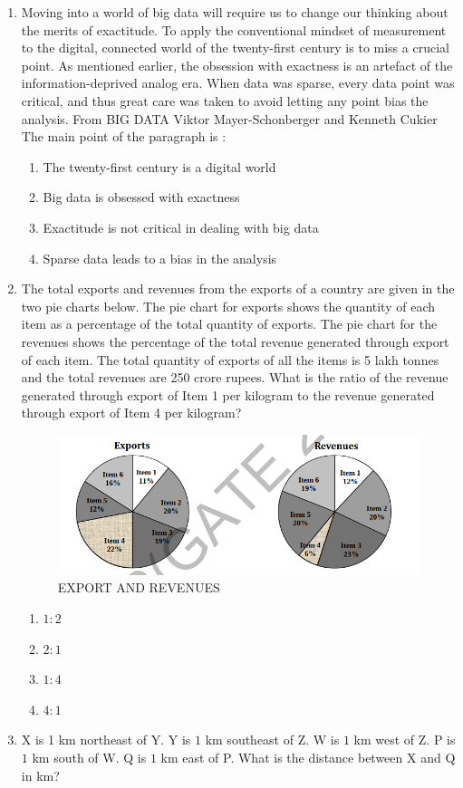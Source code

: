 \documentclass[journal,12pt,onecolumn]{IEEEtran}
\theoremstyle{remark}
\begin{document}
\begin{enumerate}
\item Moving into a world of big data will require us to change our thinking about the merits of
exactitude. To apply the conventional mindset of measurement to the digital, connected world of
the twenty-first century is to miss a crucial point. As mentioned earlier, the obsession with
exactness is an artefact of the information-deprived analog era. When data was sparse, every data
point was critical, and thus great care was taken to avoid letting any point bias the analysis.
From BIG DATA Viktor Mayer-Schonberger and Kenneth Cukier
The main point of the paragraph is $\colon$

\hfill{}
\begin{enumerate}
\item The twenty-first century is a digital world
\item Big data is obsessed with exactness 
\item Exactitude is not critical in dealing with big data
\item Sparse data leads to a bias in the analysis
\end{enumerate}

\item The total exports and revenues from the exports of a country are given in the two pie charts below. The pie chart for exports shows the quantity of each item as a percentage of the total quantity of exports. The pie chart for the revenues shows the percentage of the total revenue generated through export of each item. The total quantity of exports of all the items is 5 lakh tonnes and the total revenues are 250 crore rupees. What is the ratio of the revenue generated through export of Item 1 per kilogram to the revenue generated through export of Item 4 per kilogram?
\begin{figure}[H]
  \centering
  \includegraphics[width=0.4\columnwidth]{figs/graph1.png}
  \caption{EXPORT AND REVENUES}
  \label{fig:ladder}
\end{figure}

\hfill{}
\begin{multicols}{4}
\begin{enumerate}
\item $1$$\colon$$2$
\item $2$$\colon$$1$
\item $1$$\colon$$4$
\item $4$$\colon$$1$
\end{enumerate}
\end{multicols}
\item X is 1 km northeast of Y. Y is $1$ km southeast of Z. W is $1$ km west of Z. P is $1$ km south of W. Q is $1$ km east of P. What is the distance between X and Q in km?


\end{enumerate}
\end{document}

